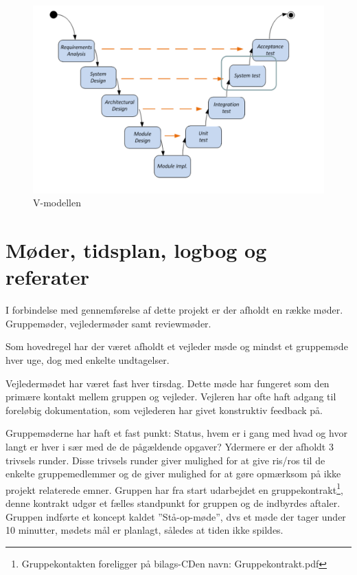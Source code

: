 \begin{figure}[h]
  \centering
    \includegraphics[width=\textwidth]{Billeder/V_modellen}
    \caption{V-modellen}
    \label{fig:V_modellen}
\end{figure}

\section{Møder, tidsplan, logbog og referater}

I forbindelse med gennemførelse af dette projekt er der afholdt en række møder. Gruppemøder, vejledermøder samt reviewmøder. 

Som hovedregel har der været afholdt et vejleder møde og mindst et gruppemøde hver uge, dog med enkelte undtagelser. 

Vejledermødet har været fast hver tirsdag. Dette møde har fungeret som den primære kontakt mellem gruppen og vejleder. Vejleren har ofte haft adgang til foreløbig dokumentation, som vejlederen har givet konstruktiv feedback på.

Gruppemøderne har haft et fast punkt: Status, hvem er i gang med hvad og hvor langt er hver i sær med de de pågældende opgaver? Ydermere er der afholdt 3 trivsels runder. Disse trivsels runder giver mulighed for at give ris/ros til de enkelte gruppemedlemmer og de giver mulighed for at gøre opmærksom på ikke projekt relaterede emner. 
Gruppen har fra start udarbejdet en gruppekontrakt\footnote{Gruppekontakten foreligger på bilags-CDen navn: Gruppekontrakt.pdf}, denne kontrakt udgør et fælles standpunkt for gruppen og de indbyrdes aftaler. Gruppen indførte et koncept kaldet ''Stå-op-møde'', dvs et møde der tager under 10 minutter, mødets mål er planlagt, således at tiden ikke spildes. 


